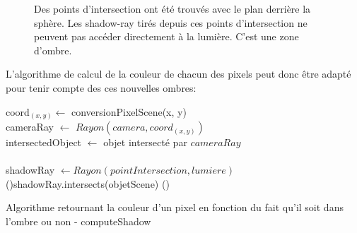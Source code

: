 \documentclass[11pt]{article}
\begin{document}
\begin{figure}[h!]

	\caption{Des points d'intersection ont été trouvés avec le plan derrière la sphère. Les shadow-ray tirés depuis ces points d'intersection ne peuvent pas accéder directement à la lumière. C'est une zone d'ombre.}
	\label{ombresSchema}
\end{figure}
\FloatBarrier

L'algorithme de calcul de la couleur de chacun des pixels peut donc être adapté pour tenir compte des ces nouvelles ombres:

\begin{algorithm}[H]
	
	coord$_{(x, y)} \gets$ conversionPixelScene(x, y)\\
	cameraRay $\gets$ $Rayon(camera, coord_{(x, y)})$\\
	{
		intersectedObject $\gets$ objet intersecté par $cameraRay$\\\hfill\\
		shadowRay $\gets Rayon(pointIntersection, lumiere)$\\
		\If(){shadowRay.intersects(objetScene)}
		{
		}
		\Else()
		{
		}
	}
	\Else
	{
	}

	\caption{Algorithme retournant la couleur d'un pixel en fonction du fait qu'il soit dans l'ombre ou non - computeShadow}
	\label{algoOmbres}
\end{algorithm}
\end{document}
